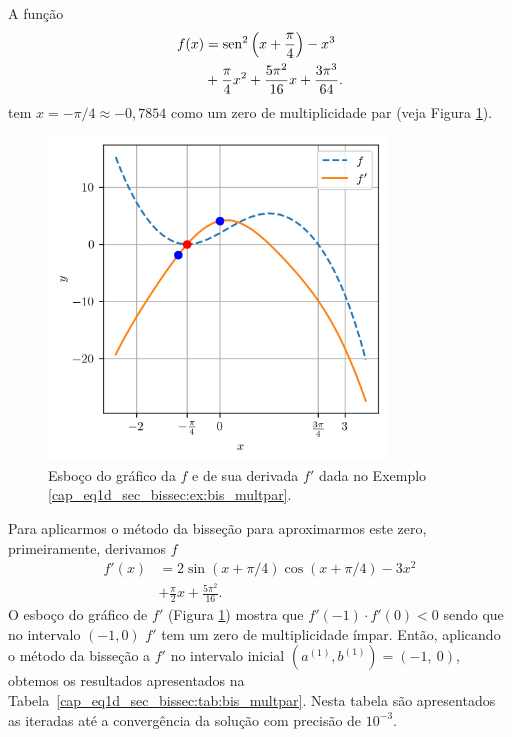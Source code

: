 \begin{ex}\label{cap_eq1d_sec_bissec:ex:bis_multpar}
  A função
  \begin{equation}
    \begin{aligned}
      f(x) &= \operatorname{sen}^2\left(x+\frac{\pi}{4}\right) - x^3 \\
           &+ \frac{\pi}{4}x^2 + \frac{5\pi^2}{16}x + \frac{3\pi^3}{64}.
    \end{aligned}
\end{equation}
tem $x=-\pi/4\approx -0,7854$ como um zero de multiplicidade par (veja Figura \ref{cap_eq1d_sec_bissec:fig:bis_multpar}).

\begin{figure}[H]
  \centering
  \includegraphics[width=0.8\textwidth]{./cap_eq1d/dados/fig_bis_multpar/fig}
  \caption{Esboço do gráfico da $f$ e de sua derivada $f'$ dada no Exemplo \ref{cap_eq1d_sec_bissec:ex:bis_multpar}.}
  \label{cap_eq1d_sec_bissec:fig:bis_multpar}
\end{figure}

Para aplicarmos o método da bisseção para aproximarmos este zero, primeiramente, derivamos $f$
\begin{equation}
  \begin{aligned}
    f'(x) &= 2\sin(x+\pi/4)\cos(x+\pi/4) - 3x^2 \\
          &+ \frac{\pi}{2}x + \frac{5\pi^2}{16}.
  \end{aligned}
\end{equation}
O esboço do gráfico de $f'$ (Figura \ref{cap_eq1d_sec_bissec:fig:bis_multpar}) mostra que $f'(-1)\cdot f'(0) < 0$ sendo que no intervalo $(-1, 0)$ $f'$ tem um zero de multiplicidade ímpar. Então, aplicando o método da bisseção a $f'$ no intervalo inicial $(a^{(1)}, b^{(1)}) = (-1, ~0)$, obtemos os resultados apresentados na Tabela~\ref{cap_eq1d_sec_bissec:tab:bis_multpar}. Nesta tabela são apresentados as iteradas até a convergência da solução com precisão de $10^{-3}$.


\end{ex}
